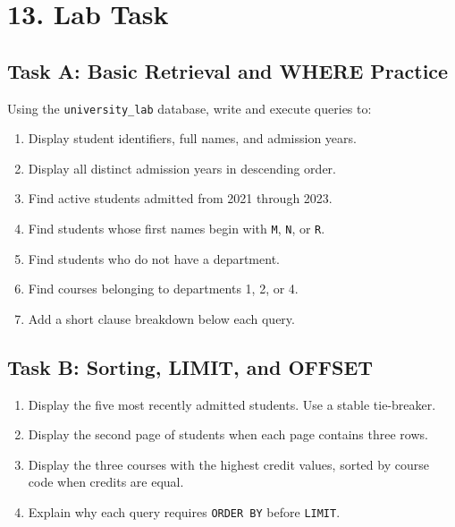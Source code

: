 \documentclass[12pt,a4paper]{article}
\begin{document}
\section*{13. Lab Task}

\subsection*{Task A: Basic Retrieval and WHERE Practice}
Using the \texttt{university\_lab} database, write and execute queries to:
\begin{enumerate}
    \item Display student identifiers, full names, and admission years.
    \item Display all distinct admission years in descending order.
    \item Find active students admitted from 2021 through 2023.
    \item Find students whose first names begin with \texttt{M}, \texttt{N}, or \texttt{R}.
    \item Find students who do not have a department.
    \item Find courses belonging to departments 1, 2, or 4.
    \item Add a short clause breakdown below each query.
\end{enumerate}

\subsection*{Task B: Sorting, LIMIT, and OFFSET}
\begin{enumerate}
    \item Display the five most recently admitted students. Use a stable tie-breaker.
    \item Display the second page of students when each page contains three rows.
    \item Display the three courses with the highest credit values, sorted by course code when
    credits are equal.
    \item Explain why each query requires \texttt{ORDER BY} before \texttt{LIMIT}.
\end{enumerate}
\end{document}
